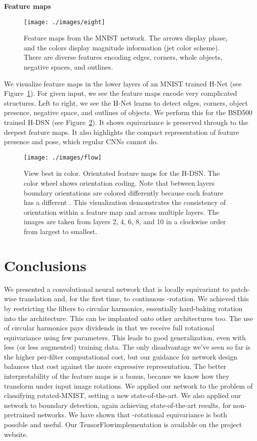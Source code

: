 \documentclass[10pt,twocolumn,letterpaper]{article}
\begin{document}
\textbf{Feature maps}
\begin{figure}[t]
\begin{center}
	\texttt{[image: ./images/eight]}
\end{center}
\caption{Feature maps from the MNIST network. The arrows display phase, and the colors display magnitude information (jet color scheme). There are diverse features encoding edges, corners, whole objects, negative spaces, and outlines.}
\label{fig:feature_maps}
\vspace{-1em}
\end{figure}
We visualize feature maps in the lower layers of an MNIST trained 
H-Net (see Figure~\ref{fig:feature_maps}). 
For given input, we see the feature maps encode very 
complicated structures. Left to right, we see the H-Net 
learns to detect edges, corners, object presence, negative space, 
and outlines of objects. We perform this for the BSD500 trained
H-DSN (see Figure~\ref{fig:flow}). It shows equivariance
is preserved through to the deepest feature maps.
It also highlights the compact representation of feature presence and pose,
which regular CNNs cannot do.
\begin{figure}[b]
\vspace{-1em}
	\texttt{[image: ./images/flow]}
    \caption{View best in color. 
    Orientated feature maps for the H-DSN. The color wheel shows
    orientation coding. Note that between layers boundary orientations
    are colored differently because each feature has a different . 
    This visualization demonstrates the consistency
    of orientation within a feature map and across multiple layers.
    The images are taken from layers 2, 4, 6, 8, and 10 in a clockwise
    order from largest to smallest.}
    \label{fig:flow}
\end{figure}
\section{Conclusions}
We presented a convolutional neural network that is locally equivariant to patch-wise translation and, for the first time, to continuous -rotation. We achieved this by restricting the filters to circular harmonics, essentially hard-baking rotation into the architecture. This can be implanted onto other architectures too. The use of circular harmonics pays dividends in that we receive full rotational equivariance using few parameters. This leads to good generalization, even with less (or less augmented) training data. The only disadvantage we've seen so far is the higher per-filter computational cost, but our guidance for network design balances that cost against the more expressive representation. The better interpretability of the feature maps is a bonus, because we know how they transform under input image rotations. We applied our network to the problem of classifying rotated-MNIST, setting a new state-of-the-art. We also applied our network to boundary detection, again achieving state-of-the-art results, for non-pretrained networks. We have shown that -rotational equivariance is both possible and useful. Our TensorFlow\texttrademark   implementation is available on the project website. 
\end{document}
